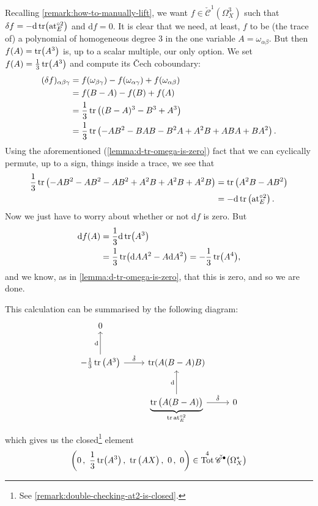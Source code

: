 \documentclass[11pt,fleqn]{article}
\theoremstyle{plain}
\theoremstyle{definition}
\theoremstyle{remark}
\numberwithin{equation}{theorem}
\newcommand{\anotherbullet}{\star}
\newcommand{\cech}{\check{\mathscr{C}}}
\newcommand{\at}{\mathrm{at}}
\newcommand{\expat}[1]{\at^{\circ#1}}
\renewcommand{\d}{\mathrm{d}}
\DeclareMathOperator{\Tot}{Tot}
\begin{document}
        Recalling \cref{remark:how-to-manually-lift}, we want $f\in\cech^1(\Omega_X^3)$ such that $\delta f=-\d\tr(\expat{2}_E)$ and $\d f=0$.
        It is clear that we need, at least, $f$ to be (the trace of) a polynomial of homogeneous degree $3$ in the one variable $A=\omega_{\alpha\beta}$.
        But then $f(A)=\tr(A^3)$ is, up to a scalar multiple, our only option.
        We set $f(A)=\frac13\tr(A^3)$ and compute its Čech coboundary:
        \begin{align*}
            (\delta f)_{\alpha\beta\gamma} &= f(\omega_{\beta\gamma})-f(\omega_{\alpha\gamma})+f(\omega_{\alpha\beta})\\
            &= f(B-A)-f(B)+f(A)\\
            &= \frac13\tr\big((B-A)^3-B^3+A^3\big)\\
            &= \frac13\tr\left(-AB^2 -BAB - B^2A + A^2B + ABA + BA^2\right).
        \end{align*}
        Using the aforementioned (\cref{lemma:d-tr-omega-is-zero}) fact that we can cyclically permute, up to a sign, things inside a trace, we see that
        \begin{align*}
            \frac13\tr\left(-AB^2-AB^2-AB^2+A^2B+A^2B+A^2B\right)
            &= \tr\left(A^2B - AB^2\right)\\
            &= -\d\tr\left(\expat{2}_E\right).
        \end{align*}
        Now we just have to worry about whether or not $\d f$ is zero.
        But
        \begin{align*}
            \d f(A) &= \frac13\d\tr(A^3)
        \\  &= \frac13\tr(\d A A^2-A\d A^2)
            = -\frac13\tr(A^4),
        \end{align*}
        and we know, as in \cref{lemma:d-tr-omega-is-zero}, that this is zero, and so we are done.

        This calculation can be summarised by the following diagram:
        \begin{equation}
        \label{equation:second-atiyah-class-summary}
            \begin{tikzcd}[row sep=large]
                0&&\\
                -\frac13\tr\left(A^3\right)
                    \ar[u,"\mathrm{d}"]
                    \ar[r,"\check\delta"]
                &\tr(A(B-A)B)
                &\\
                &\underbrace{\tr\big(A(B-A)\big)}_{\tr\expat{2}_E}
                    \ar[u,"\mathrm{d}"]
                    \ar[r,"\check\delta"]
                & 0
            \end{tikzcd}
        \end{equation}
        which gives us the closed\footnote{See \cref{remark:double-checking-at2-is-closed}.} element
        \begin{equation}
            \left(
                0\,,\,\,
                \frac13\tr(A^3)\,,\,\,
                \tr\big(AX\big)\,,\,\,
                0\,,\,\,
                0
            \right)\in\Tot^4\cech^\bullet\big(\Omega_X^\anotherbullet\big)
        \end{equation}
\end{document}
